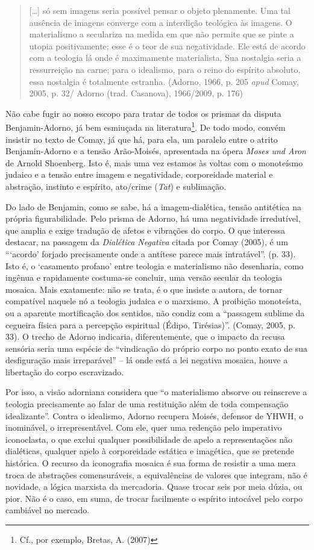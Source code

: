 \begin{quote}
{[}\ldots{}{]} só sem imagens seria possível pensar o objeto plenamente. Uma
tal ausência de imagens converge com a interdição teológica às imagens.
O materialismo a seculariza na medida em que não permite que se pinte a
utopia positivamente; esse é o teor de sua negatividade. Ele está de
acordo com a teologia lá onde é maximamente materialista. Sua nostalgia
seria a ressurreição na carne; para o idealismo, para o reino do
espírito absoluto, essa nostalgia é totalmente estranha. (Adorno, 1966,
p. 205 \emph{apud} Comay, 2005, p. 32/ Adorno (trad. Casanova),
1966/2009, p. 176)
\end{quote}

Não cabe fugir ao nosso escopo para tratar de todos os prismas da
disputa Benjamin-Adorno, já bem esmiuçada na literatura\footnote{Cf.,
  por exemplo, Bretas, A. (2007)}. De todo modo, convém insistir no
texto de Comay, já que há, para ela, um paralelo entre o atrito
Benjamin-Adorno e a tensão Arão-Moisés, apresentada na ópera \emph{Moses
und Aron} de Arnold Shoenberg. Isto é, mais uma vez estamos às voltas
com o monoteísmo judaico e a tensão entre imagem e negatividade,
corporeidade material e abstração, instinto e espírito, ato/crime
(\emph{Tat}) e sublimação.

Do lado de Benjamin, como se sabe, há a imagem-dialética, tensão
antitética na própria figurabilidade. Pelo prisma de Adorno, há uma
negatividade irredutível, que amplia e exige tradução de afetos e
vibrações do corpo. O que interessa destacar, na passagem da
\emph{Dialética Negativa} citada por Comay (2005), é um ```acordo'
forjado precisamente onde a antítese parece mais intratável''. (p. 33).
Isto é, o `casamento profano' entre teologia e materialismo não
desenharia, como ingênua e rapidamente costuma-se concluir, uma versão
secular da teologia mosaica. Mais exatamente: não se trata, é o que
insiste a autora, de tornar compatível naquele nó a teologia judaica e o
marxismo. A proibição monoteísta, ou a aparente mortificação dos
sentidos, não condiz com a ``passagem sublime da cegueira física para a
percepção espiritual (Édipo, Tirésias)''. (Comay, 2005, p. 33). O trecho
de Adorno indicaria, diferentemente, que o impacto da recusa sensória
seria uma espécie de ``vindicação do próprio corpo no ponto exato de sua
desfiguração mais irreparável'' -- lá onde está a lei negativa mosaica,
houve a libertação do corpo escravizado.

Por isso, a visão adorniana considera que ``o materialismo absorve ou
reinscreve a teologia precisamente ao falar de uma restituição além de
toda compensação idealizante''. Contra o idealismo, Adorno recupera
Moisés, defensor de YHWH, o inominável, o irrepresentável. Com ele, quer
uma redenção pelo imperativo iconoclasta, o que exclui qualquer
possibilidade de apelo a representações não dialéticas, qualquer apelo à
corporeidade estática e imagética, que se pretende histórica. O recurso
da iconografia mosaica é sua forma de resistir a uma mera troca de
abstrações comensuráveis, a equivalências de valores que integram, não é
novidade, a lógica marxista da mercadoria. Quase trocar seis por meia
dúzia, ou pior. Não é o caso, em suma, de trocar facilmente o espírito
intocável pelo corpo cambiável no mercado.


